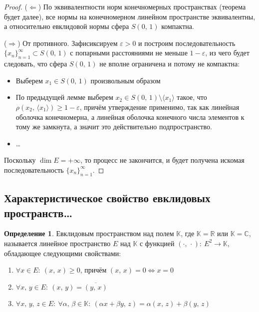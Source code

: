 \documentclass[a4paper,12pt]{article}
\renewcommand{\geq}{\ensuremath{\geqslant}}
\theoremstyle{plain}
\theoremstyle{definition}
\newtheorem{definition}{Определение}[section]
\theoremstyle{remark}
\begin{document}
\begin{proof}
	($\Leftarrow$) По эквивалентности норм конечномерных пространствах (теорема будет далее), все нормы на конечномерном линейном пространстве эквивалентны, а относительно евклидовой нормы сфера $S(0,\,1)$ компактна.

	($\Rightarrow$) От противного. Зафисиксируем $\varepsilon > 0$ и построим последовательность $\{x_n\}_{n=1}^\infty \subset S(0,\,1)$ с попарными расстояниями не меньше $1 - \varepsilon$, из чего будет следовать, что сфера $S(0,\,1)$ не вполне ограничена и потому не компактна:
	\begin{itemize}
		\item Выберем $x_1 \in S(0,\,1)$ произвольным образом
		\item По предыдущей лемме выберем $x_2 \in S(0,\,1) \setminus \langle x_1\rangle$ такое, что $\rho(x_2,\, \langle x_1\rangle) \geq 1 - \varepsilon$, причём утверждение применимо, так как линейная оболочка конечномерна, а линейная оболочка конечного числа элементов к тому же замкнута, а значит это действительно подпространство.
		\item \dots
	\end{itemize}
	Поскольку $\dim E = +\infty$, то процесс не закончится, и будет получена искомая последовательность $\{x_n\}_{n = 1}^\infty$.
\end{proof}

\subsection{Характеристическое свойство евклидовых пространств\dots}
\begin{definition}
	Евклидовым пространством над полем $\mathbb{K}$, где $\mathbb{K} = \mathbb{R}$ или $\mathbb{K} = \mathbb{C}$, называется линейное пространство $E$ над $\mathbb{K}$ с функцией $(\cdot,\, \cdot) :\: E^2 \to \mathbb{K}$, обладающее следующими свойствами:
	\begin{enumerate}
		\item $\forall x \in E :\: (x,\, x) \geq 0$, причём $(x,\, x) = 0 \Leftrightarrow x = 0$
		\item $\forall x,\,y \in E :\: (x,\,y) = \overline{(y,\, x)}$
		\item $\forall x,\,y,\, z \in E :\: \forall \alpha,\, \beta \in \mathbb{K} :\: (\alpha x + \beta y,\, z) = \alpha(x,\,z) + \beta(y,\,z)$
	\end{enumerate}
\end{definition}
\end{document}
